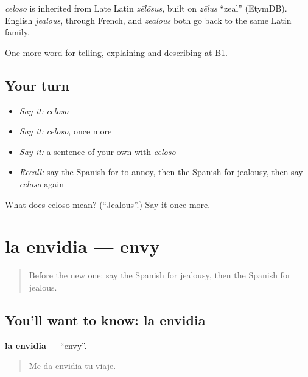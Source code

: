 \begin{cousinweb}
\emph{celoso} is inherited from Late Latin \emph{zēlōsus}, built on \emph{zēlus} \textquotedblleft{}zeal\textquotedblright{} (EtymDB). English \emph{jealous}, through French, and \emph{zealous} both go back to the same Latin family.
\end{cousinweb}

\begin{grammarlens}[title={What you've built}]
One more word for telling, explaining and describing at B1.
\end{grammarlens}

\subsection*{Your turn}
\begin{itemize}
\raggedright
  \item \emph{Say it:} \emph{celoso}
  \item \emph{Say it:} \emph{celoso}, once more
  \item \emph{Say it:} a sentence of your own with \emph{celoso}
  \item \emph{Recall:} say the Spanish for to annoy, then the Spanish for jealousy, then say \emph{celoso} again
\end{itemize}

\begin{tcolorbox}[breakable,colback=teal!4,colframe=teal!35!black,title={Before you move on}]
What does celoso mean? (\textquotedblleft{}Jealous\textquotedblright{}.) Say it once more.
\end{tcolorbox}
\section[la envidia]{la envidia — envy}

\label{lesson:ES-C708-envidia}



\begin{quote}
Before the new one: say the Spanish for jealousy, then the Spanish for jealous.
\end{quote}

\subsection*{You'll want to know: la envidia}
\textbf{la envidia} — \textquotedblleft{}envy\textquotedblright{}.

\begin{quote}
Me da envidia tu viaje.
\end{quote}

